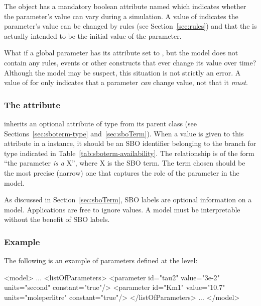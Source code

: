 The \Parameter object has a mandatory boolean attribute named
 which indicates whether the parameter's value can
vary during a simulation. A value of  indicates the parameter's
value can be changed by rules (see Section~\ref{sec:rules}) and
that the  is actually intended to be the initial
value of the parameter.

What if a global parameter has its  attribute set to
, but the model does not contain any rules, events or
other constructs that ever change its value over time?  Although
the model may be suspect, this situation is not strictly an error.
A value of  for  only indicates that a
parameter \emph{can} change value, not that it \emph{must}.


\subsubsection{The  attribute}
\label{sec:parameter-sboterm}

\Parameter inherits an optional 
attribute of type  from its parent
class \SBase (see Sections~\ref{sec:sboterm-type}
and~\ref{sec:sboTerm}).  When a value is given to this
attribute in a \Parameter instance, it should be an
SBO identifier belonging to the branch for type \Parameter 
indicated in Table~\ref{tab:sboterm-availability}.  The relationship is
of the form ``the parameter \emph{is a} X'', where X is
the SBO term.  The term chosen should be the most precise (narrow)
one that captures the role of the parameter in the model.

As discussed in Section~\ref{sec:sboTerm}, SBO labels are optional
information on a model.  Applications are free to ignore
 values.  A model must be interpretable without the
benefit of SBO labels.


\subsubsection{Example}

The following is an example of parameters defined at the \Model level:

\begin{example}
<model>
    ...
    <listOfParameters>
        <parameter id="tau2" value="3e-2" units="second" constant="true"/>
        <parameter id="Km1" value="10.7" units="moleperlitre" constant="true"/>
    </listOfParameters>
    ...
</model>
\end{example}
\vspace*{-1ex}


